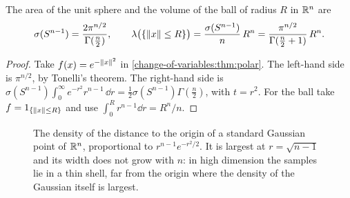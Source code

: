\begin{notechapter}
\begin{corollary}\label{change-of-variables:cor:ball}
The area of the unit sphere and the volume of the ball of radius $R$ in
$\mathbb{R}^n$ are
\[
  \sigma(S^{n-1}) = \frac{2\pi^{n/2}}{\Gamma(\frac n2)} , \qquad
  \lambda\bigl(\{\left\|x\right\|\leq R\}\bigr)
  = \frac{\sigma(S^{n-1})}n\,R^n
  = \frac{\pi^{n/2}}{\Gamma(\frac n2 + 1)}\,R^n .
\]
\end{corollary}

\begin{proof}
Take $f(x) = e^{-\left\|x\right\|^2}$ in \cref{change-of-variables:thm:polar}. The
left-hand side is $\pi^{n/2}$, by Tonelli's theorem. The right-hand side
is $\sigma(S^{n-1})\int_0^\infty e^{-r^2}r^{n-1}\,\dd r
= \frac12\sigma(S^{n-1})\Gamma(\frac n2)$, with $t = r^2$. For the ball
take $f = 1_{\{\left\|x\right\|\leq R\}}$ and use $\int_0^Rr^{n-1}\dd r = R^n/n$.
\end{proof}

\begin{figure}[ht]
\centering
{}
\caption{The density of the distance to the origin of a standard
Gaussian point of $\mathbb{R}^n$, proportional to $r^{n-1}e^{-r^2/2}$. It is
largest at $r = \sqrt{n - 1}$ and its width does not grow with $n$: in
high dimension the samples lie in a thin shell, far from the origin
where the density of the Gaussian itself is largest.}
\label{change-of-variables:fig:shell}
\end{figure}


\end{notechapter}
